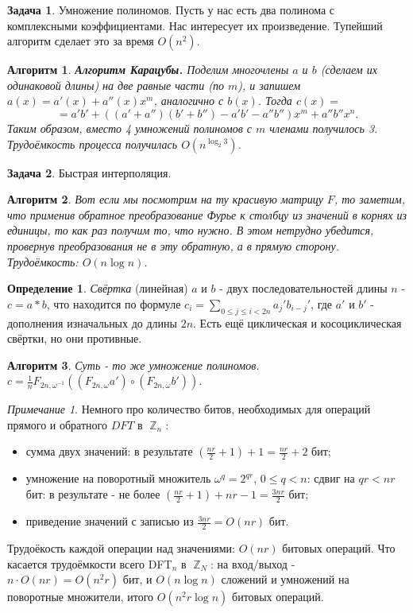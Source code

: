 \documentclass[a4paper]{article}
\theoremstyle{indented}
\newtheorem{alg}{Алгоритм}
\theoremstyle{definition}
\newtheorem{defn}{Определение}
\newtheorem{prob}{Задача}
\theoremstyle{remark}
\newtheorem{remark}{Примечание}
\DeclareMathOperator{\ZZ}{\mathbb{Z}}
\begin{document}
\begin{prob}
    Умножение полиномов. Пусть у нас есть два полинома с комплексными коэффициентами. Нас интересует их произведение. Тупейший алгоритм сделает это за время $O(n^2)$. 
\end{prob}

\begin{alg}
    \textbf{Алгоритм Карацубы.} Поделим многочлены $a$ и $b$ (сделаем их одинаковой длины) на две равные части (по $m$), и запишем $a(x)=a'(x)+a''(x)x^m$, аналогично с $b(x)$. Тогда $c(x)=$
    \[
        = a'b'+((a'+a'')(b'+b'')-a'b'-a''b'')x^m+a''b''x^n. 
    \]
    Таким образом, вместо 4 умножений полиномов с $m$ членами получилось 3. Трудоёмкость процесса получилась $O(n^{\log_2 3})$.  
\end{alg}

\begin{prob}
    Быстрая интерполяция.
\end{prob}

\begin{alg}
    Вот если мы посмотрим на ту красивую матрицу $F$, то заметим, что применив обратное преобразование Фурье к столбцу из значений в корнях из единицы, то как раз получим то, что нужно. В этом нетрудно убедится, провернув преобразования не в эту обратную, а в прямую сторону. Трудоёмкость: $O(n\log n)$. 
\end{alg}

\begin{defn}
    \textit{Свёртка} (линейная) $a$ и $b$ - двух последовательностей длины $n$ - $c=a*b$, что находится по формуле $c_i=\sum_{0\leq j\leq i <2n} a_j'b_{i-j}'$, где $a'$ и $b'$ - дополнения изначальных до длины $2n$. Есть ещё циклическая и косоциклическая свёртки, но они противные.
\end{defn}

\begin{alg}
    Суть - то же умножение полиномов. $c=\frac{1}{n} F_{2n, \omega^{-1}}((F_{2n, \omega}a')\circ (F_{2n, \omega}b'))$.
\end{alg}

\begin{remark}
    Немного про количество битов, необходимых для операций прямого и обратного $DFT$ в $\ZZ_n$:

    \begin{itemize}
        \item сумма двух значений: в результате $(\frac{nr}{2}+1)+1=\frac{nr}{2}+2$ бит;
        \item умножение на поворотный множитель $\omega^q=2^{qr}$, $0\leq q< n$: сдвиг на $qr<nr$ бит: в результате - не более $(\frac{nr}{2}+1)+nr-1=\frac{3nr}{2}$ бит; 
        \item приведение значений с записью из $\frac{3nr}{2}=O(nr)$ бит.
    \end{itemize}

    Трудоёкость каждой операции над значениями: $O(nr)$ битовых операций. Что касается трудоёмкости всего DFT$_n$ в $\ZZ_N$: на вход/выход - $n\cdot O(nr)=O(n^2r)$ бит, и $O(n \log n)$ сложений и умножений на поворотные множители, итого $O(n^2r \log n)$ битовых операций.
\end{remark}
\end{document}
